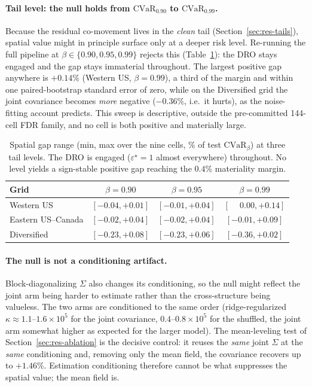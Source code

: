 \documentclass[12pt]{article}
\newcommand{\CVaR}{\mathrm{CVaR}}
\begin{document}
\paragraph{Tail level: the null holds from $\CVaR_{0.90}$ to $\CVaR_{0.99}$.}
Because the residual co-movement lives in the \emph{clean} tail
(Section~\ref{sec:res-tails}), spatial value might in principle surface only at a deeper
risk level. Re-running the full pipeline at $\beta\in\{0.90,0.95,0.99\}$ rejects this
(Table~\ref{tab:cvarsweep}): the DRO stays engaged and the gap stays immaterial throughout.
The largest positive gap anywhere is $+0.14\%$ (Western US, $\beta=0.99$), a third of the
margin and within one paired-bootstrap standard error of zero, while on the Diversified
grid the joint covariance becomes \emph{more} negative ($-0.36\%$, i.e.\ it hurts), as the
noise-fitting account predicts. This sweep is descriptive, outside the pre-committed
144-cell FDR family, and no cell is both positive and materially large.

\begin{table}[h]
\centering\small
\caption{Spatial gap range (min, max over the nine cells, \% of test
$\CVaR_\beta$) at three tail levels. The DRO is engaged ($\varepsilon^\star=1$
almost everywhere) throughout. No level yields a sign-stable positive gap reaching
the $0.4\%$ materiality margin.}
\label{tab:cvarsweep}
\begin{tabular}{lccc}
\toprule
Grid & $\beta=0.90$ & $\beta=0.95$ & $\beta=0.99$\\
\midrule
Western US         & $[-0.04,+0.01]$ & $[-0.01,+0.04]$ & $[\phantom{-}0.00,+0.14]$\\
Eastern US--Canada & $[-0.02,+0.04]$ & $[-0.02,+0.04]$ & $[-0.01,+0.09]$\\
Diversified        & $[-0.23,+0.08]$ & $[-0.23,+0.06]$ & $[-0.36,+0.02]$\\
\bottomrule
\end{tabular}
\end{table}

\paragraph{The null is not a conditioning artifact.} Block-diagonalizing $\Sigma$
also changes its conditioning, so the null might reflect the joint arm
being harder to estimate rather than the cross-structure being valueless. The two
arms are conditioned to the same order (ridge-regularized $\kappa\approx
1.1$--$1.6\times10^5$ for the joint covariance, $0.4$--$0.8\times10^5$ for the
shuffled, the joint arm somewhat higher as expected for the larger model). The
mean-leveling test of Section~\ref{sec:res-ablation} is the decisive control: it reuses
the \emph{same} joint $\Sigma$ at the \emph{same} conditioning and, removing only
the mean field, the covariance recovers up to $+1.46\%$. Estimation conditioning
therefore cannot be what suppresses the spatial value; the mean field is.
\end{document}
